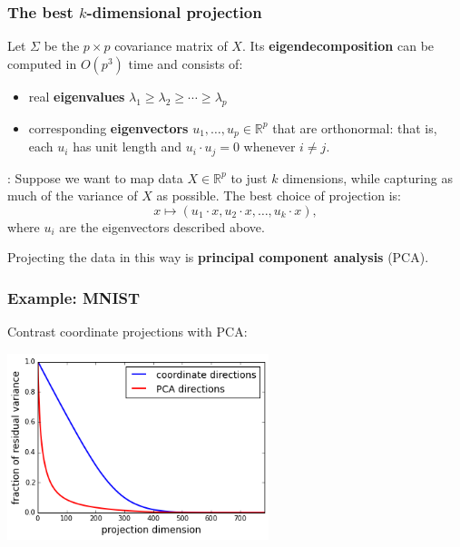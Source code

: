 \documentclass[smaller]{beamer}
\def\R{{\mathbb R}}
\def\darkred{\color{red!70!black}}
\def\v2{{\vskip.2in}}
\def\R{{\mathbb R}}
\begin{document}
\begin{frame}
\frametitle{The best $k$-dimensional projection}

Let $\Sigma$ be the $p \times p$ covariance matrix of $X$. Its {\bf eigendecomposition} 
can be computed in $O(p^3)$ time and consists of:
\begin{itemize}
\item real {\bf eigenvalues} $\lambda_1 \geq \lambda_2 \geq \cdots \geq \lambda_p$
\item corresponding {\bf eigenvectors} $u_1, \ldots, u_p \in \R^p$ that are orthonormal: that is, each $u_i$ has unit length and $u_i \cdot u_j = 0$ whenever $i \neq j$.
\end{itemize}

\pause\v2
{\darkred {\bf Theorem}: Suppose we want to map data $X \in \R^p$ to just $k$ dimensions,
while capturing as much of the variance of $X$ as possible. The best choice of 
projection is:
$$ x \mapsto (u_1 \cdot x, u_2 \cdot x, \ldots, u_k \cdot x),$$
where $u_i$ are the eigenvectors described above.}

\pause\v2
\alert{Projecting the data in this way is {\bf principal component analysis} (PCA).}

\end{frame}

\begin{frame}
\frametitle{Example: MNIST}

Contrast coordinate projections with PCA:

\begin{center}
\includegraphics[width=3in]{mnist-compare.png}
\end{center}

\end{frame}
\end{document}
